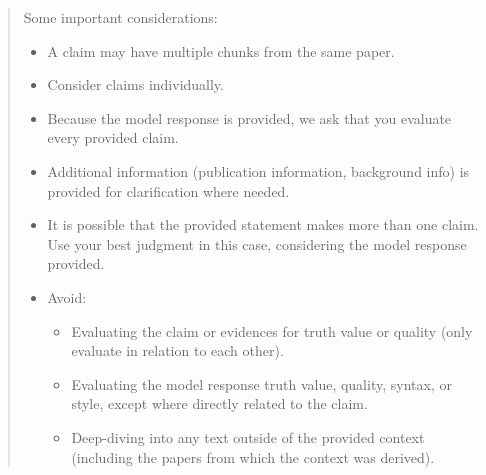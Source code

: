 \begin{quote}
Some important considerations:
\begin{itemize}
    \item A claim may have multiple chunks from the same paper.
    \item Consider claims individually.
    \item Because the model response is provided, we ask that you evaluate every provided claim.
    \item Additional information (publication information, background info) is provided for clarification where needed.
    \item It is possible that the provided statement makes more than one claim. Use your best judgment in this case, considering the model response provided.
    \item Avoid:
    \begin{itemize}
        \item Evaluating the claim or evidences for truth value or quality (only evaluate in relation to each other).
        \item Evaluating the model response truth value, quality, syntax, or style, except where directly related to the claim.
        \item Deep-diving into any text outside of the provided context (including the papers from which the context was derived).
    \end{itemize}
\end{itemize}
\end{quote}

  
